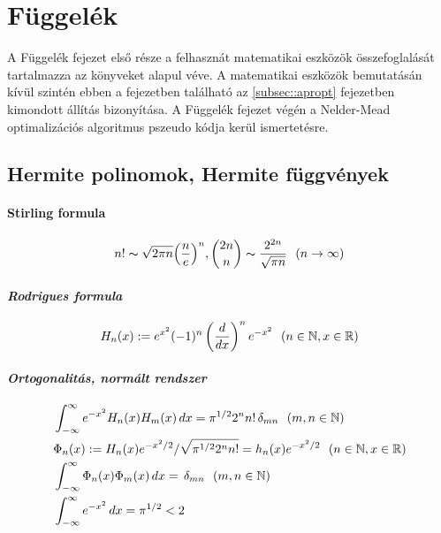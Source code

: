 \documentclass[oneside,titlepage,12pt,a4paper]{report}
\begin{document}
\chapter{Függelék} \label{ch::fugg}

A Függelék fejezet első része a felhasznát matematikai eszközök összefoglalását tartalmazza az \cite{szego, szokefalviNagy} könyveket alapul véve. A matematikai eszközök bemutatásán kívül szintén ebben a fejezetben található az \ref{subsec::apropt} fejezetben kimondott állítás bizonyítása. A Függelék fejezet végén a Nelder-Mead optimalizációs algoritmus pszeudo kódja kerül ismertetésre. 

\section {Hermite  polinomok, Hermite függvények}
\subsubsection{Stirling  formula}
\begin{equation*}
n!\thicksim \sqrt {2\pi n}\Big(\frac ne\Big)^n,  \binom {2n} n\thicksim \frac {2^{2n}}{\sqrt{\pi n}}\ \ (
n\to\infty)
\end{equation*}

\subsubsection{\it  Rodrigues formula}
\begin{equation}
\begin{split}
&H_n(x):=e^{x^2}(-1)^n\left(\frac d{dx}\right)^n e^{-x^2}\ \ (n\in\Bbb N, x\in\Bbb R)\\
\end{split}
\end{equation}

\subsubsection{\it  Ortogonalitás, normált rendszer}
\begin{equation}
\begin{split}
&\int_{-\infty}^\infty e^{-x^2}H_n(x)H_m(x)\, dx=\pi^{1/2}2^n n!\, \delta_{mn}\ \ (m,n\in\Bbb N)\\
&\Phi_n(x):=H_n(x)e^{-x^2/2}/\sqrt{\pi^{1/2}2^n n!}=h_n(x)e^{-x^2/2} \ \ (n\in\Bbb N, x\in\Bbb R)\\
&\int_{-\infty}^\infty \Phi_n(x)\Phi_m(x)\, dx=\, \delta_{mn}\ \ (m,n\in\Bbb N)\\
&\int_{-\infty}^\infty e^{-x^2}\, dx=\pi^{1/2}<2
\end{split}
\end{equation}
\end{document}
